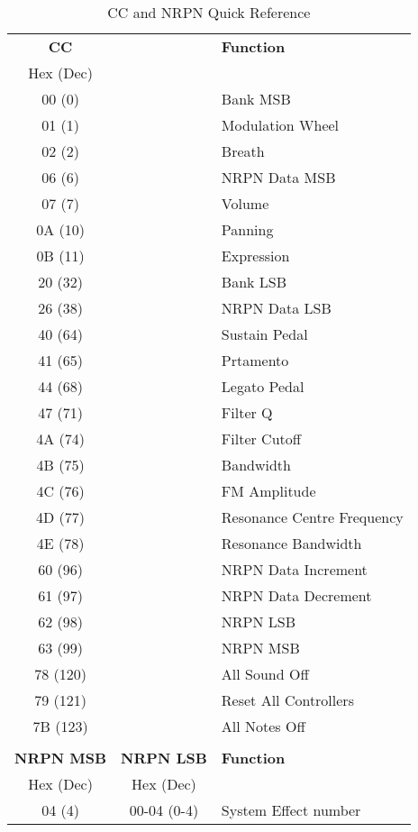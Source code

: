      \begin{table}[H]
      \centering
      \caption{CC and NRPN Quick Reference}
      \label{table:CCandNRPNreference}
      \begin{tabular}{c c l}
    \textbf{CC} & & \textbf{Function} \\
       Hex (Dec) \\
       00 (0) & & Bank MSB\\
       01 (1) & & Modulation Wheel\\
       02 (2) & & Breath\\
       06 (6) & & NRPN Data MSB\\
       07 (7) & & Volume\\
       0A (10) & & Panning\\
       0B (11) & & Expression\\
       20 (32) & & Bank LSB\\
       26 (38) & & NRPN Data LSB \\
       40 (64) & & Sustain Pedal \\
       41 (65) & & Prtamento \\
       44 (68) & & Legato Pedal \\
       47 (71) & & Filter Q \\
       4A (74) & & Filter Cutoff \\
       4B (75) & & Bandwidth \\
       4C (76) & & FM Amplitude \\
       4D (77) & & Resonance Centre Frequency\\
       4E (78) & & Resonance Bandwidth \\
       60 (96) & & NRPN Data Increment \\
       61 (97) & & NRPN Data Decrement \\
       62 (98) & & NRPN LSB \\
       63 (99) & & NRPN MSB \\
       78 (120) & & All Sound Off \\
       79 (121) & & Reset All Controllers \\
       7B (123) & & All Notes Off\\
       \\
    \textbf{NRPN MSB} & \textbf{NRPN LSB} & \textbf{Function} \\
        Hex (Dec) & Hex (Dec)\\
        04 (4) & 00-04 (0-4)& System Effect number \\

\end{tabular}
\end{table}
